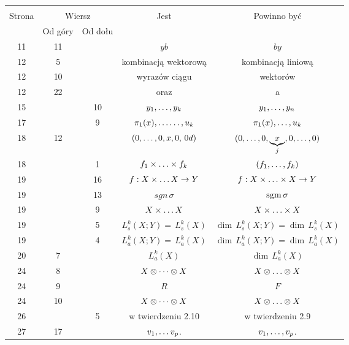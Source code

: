 \documentclass[a4paper,11pt]{article}
\begin{document}
\newpage
{}
\begin{center}
  \begin{tabular}{|c|c|c|c|c|}
    \hline
    & \multicolumn{2}{c|}{} & & \\
    Strona & \multicolumn{2}{c|}{Wiersz} & Jest
                              & Powinno być \\ \cline{2-3}
    & Od góry & Od dołu & & \\
    \hline
    11  & 11 & & $y b$ & $b y$ \\
    12  &  5 & & kombinacją wektorową &  kombinacją liniową \\
    12  & 10 & & wyrazów ciągu & wektorów \\
    12  & 22 & & oraz & a \\
    15  & & 10 & $y_{ 1 }, \ldots , y_{ k }$ & $y_{ 1 }, \ldots , y_{ n }$ \\
    17  & &  9 & $\pi_{ 1 }( x ), \ldots\ldots, u_{ k }$
           & $\pi_{ 1 }( x ), \ldots, u_{ k }$ \\
    18  & 12 & & $( 0, \ldots, 0, x, 0, \, 0d )$
           & $( 0, \ldots, 0, \underbrace{ x }_{ j }, 0, \ldots, 0 )$ \\
    18  & &  1 & $f_{ 1 } \times \ldots \times f_{ k }$ & $( f_{ 1 }, \ldots,
                                                 f_{ k } )$ \\
    19  & & 16 & $f : X \times \ldots X \to Y$ & $f : X \times \ldots \times X \to Y$ \\
    19  & & 13 & $sgn\, \sigma$ & $\textrm{sgm}\, \sigma$ \\
    19  & &  9 & $X \times \ldots X$ & $X \times \ldots \times X$ \\
    19  & &  5 & $L^{ k }_{ s } ( X; Y ) = \, L^{ k }_{ s } ( X )$
           & $\dim \, L^{ k }_{ s } ( X; Y )
             = \dim \, L^{ k }_{ s } ( X )$ \\
    19  & &  4 & $L^{ k }_{ a } ( X; Y ) = \, L^{ k }_{ a } ( X )$
           & $\dim \, L^{ k }_{ a } ( X; Y )
             = \dim \, L^{ k }_{ a } ( X )$ \\
    20  &  7 & & $L_{ a }^{ k }( X )$ & $\dim \, L_{ a }^{ k }( X )$ \\
    24  &  8 & & $X \otimes \cdots \otimes X$ & $X \otimes \ldots \otimes X$ \\
    24  &  9 & & $R$ & $F$ \\
    24  & 10 & & $X \otimes \cdots \otimes X$ & $X \otimes \ldots \otimes X$ \\
    26  & &  5 & w twierdzeniu 2.10 & w twierdzeniu 2.9 \\
    27  & 17 & & $v_{ 1 }, \ldots v_{ p }$. & $v_{ 1 }, \ldots, v_{ p }$. \\

\end{tabular}
\end{center}
\end{document}
